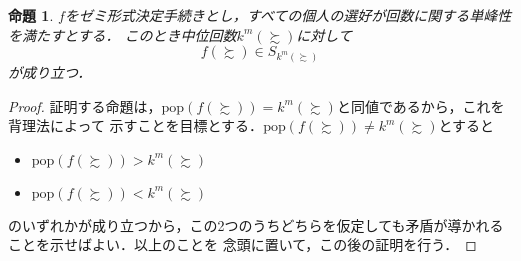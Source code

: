 \documentclass[dvipdfmx]{jsarticle}
\newtheorem{proposition}[definition]{命題}
\begin{document}
\begin{proposition}\label{prop:中位回数選択命題}
  $f$をゼミ形式決定手続きとし，すべての個人の選好が回数に関する単峰性を満たすとする．
  このとき中位回数$k^m(\succsim)$に対して
  \[
    f(\succsim) \in S_{k^m(\succsim)}
  \]
  が成り立つ．
\end{proposition}

\begin{proof}
  証明する命題は，$\mathrm{pop}(f(\succsim)) = k^m(\succsim)$と同値であるから，これを背理法によって
  示すことを目標とする．$\mathrm{pop}(f(\succsim)) \neq k^m(\succsim)$とすると
  \begin{itemize}
    \item $\mathrm{pop}(f(\succsim)) > k^m(\succsim)$
    \item $\mathrm{pop}(f(\succsim)) < k^m(\succsim)$
  \end{itemize}
  のいずれかが成り立つから，この2つのうちどちらを仮定しても矛盾が導かれることを示せばよい．以上のことを
  念頭に置いて，この後の証明を行う．


\end{proof}
\end{document}
